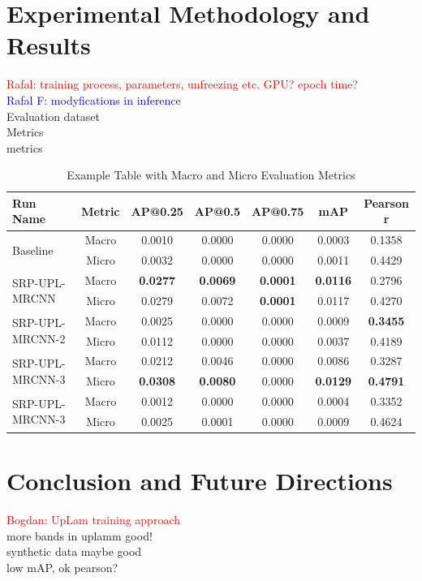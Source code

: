 \documentclass{article}
\begin{document}
\begin{sloppy}
\section{Experimental Methodology and Results}
\label{sec:pagestyle}
\textcolor{red}{Rafal: training process, parameters, unfreezing etc. GPU? epoch time?}\\
\textcolor{blue}{Rafal F: modyfications in inference}\\
Evaluation dataset\\
Metrics\\
metrics\\

\begin{table}
\centering
\caption{Example Table with Macro and Micro Evaluation Metrics}
\label{tab:example}
\begin{tabular}{lcccccc}
\toprule
\textbf{Run Name} & \textbf{Metric} & \textbf{AP@0.25} & \textbf{AP@0.5} & \textbf{AP@0.75} & \textbf{mAP} & \textbf{Pearson r} \\
\midrule
\midrule
\multirow{2}{*}{Baseline} & Macro & 0.0010 & 0.0000 & 0.0000 & 0.0003 & 0.1358 \\
& Micro & 0.0032 & 0.0000 & 0.0000 & 0.0011 & 0.4429 \\
\midrule
\multirow{2}{*}{SRP-UPL-MRCNN} & Macro & \textbf{0.0277} & \textbf{0.0069} & \textbf{0.0001} & \textbf{0.0116} & 0.2796 \\
& Micro & 0.0279 & 0.0072 & \textbf{0.0001} & 0.0117 & 0.4270 \\
\midrule
\multirow{2}{*}{SRP-UPL-MRCNN-2} & Macro & 0.0025 & 0.0000 & 0.0000 & 0.0009 & \textbf{0.3455} \\
& Micro & 0.0112 & 0.0000 & 0.0000 & 0.0037 & 0.4189 \\
\midrule
\multirow{2}{*}{SRP-UPL-MRCNN-3} & Macro & 0.0212 & 0.0046 & 0.0000 & 0.0086 & 0.3287 \\
& Micro & \textbf{0.0308} & \textbf{0.0080} & 0.0000 & \textbf{0.0129} & \textbf{0.4791} \\
\midrule
\multirow{2}{*}{SRP-UPL-MRCNN-3} & Macro & 0.0012 & 0.0000 & 0.0000 & 0.0004 & 0.3352 \\
& Micro & 0.0025 & 0.0001 & 0.0000 & 0.0009 & 0.4624 \\
\bottomrule
\end{tabular}
\end{table}

\section{Conclusion and Future Directions}
\label{sec:majhead}
\textcolor{red}{Bogdan: UpLam training approach}\\
more bands in uplamm good!\\
synthetic data maybe good\\
low mAP, ok pearson?\\




\end{sloppy}
\end{document}
